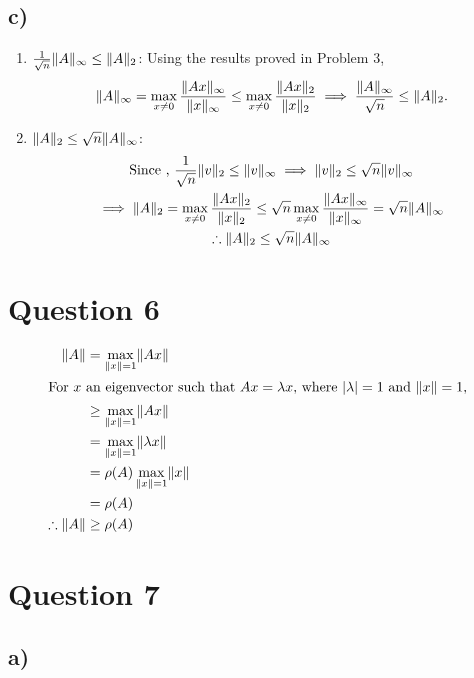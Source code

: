 \documentclass[12pt]{article}
\DeclarePairedDelimiter{\norm}{\lVert}{\rVert}
\theoremstyle{definition}
\theoremstyle{definition}
\theoremstyle{definition}
\theoremstyle{definition}
\theoremstyle{definition}
\theoremstyle{example}
\theoremstyle{note}
\theoremstyle{remark}
\theoremstyle{example}
\begin{document}
				\subsection*{c)} 
					\begin{enumerate}[label=(\roman*)]
						\item $\frac{1}{\sqrt{n}} \norm{A}_{\infty} \le \norm{A}_{2}$: Using the results proved in Problem $3$, 
						\begin{align*}
							\norm{A}_{\infty} = \max\limits_{x \neq 0 } \frac{\norm{Ax}_{\infty}}{\norm{x}_{\infty}} \le \max\limits_{x \neq 0} \frac{\norm{Ax}_{2}}{\norm{x}_{2}} \implies \frac{\norm{A}_{\infty}}{\sqrt{n }} \le \norm{A}_{2}. 
						\end{align*}
						\item $\norm{A}_{2} \le \sqrt{n} \norm{A}_{\infty}$: 
						\begin{gather*}
							\text{Since , } \frac{1}{\sqrt{n}} \norm{v}_{2} \le \norm{v}_{\infty} \implies \norm{v}_{2} \le \sqrt{n} \norm{v}_{\infty} \\
							\implies \norm{A}_{2}  = \max\limits_{x \neq 0} \frac{\norm{Ax}_{2}}{\norm{x}_{2}} \le \sqrt{n} \max\limits_{x \neq 0} \frac{\norm{Ax}_{\infty}}{\norm{x}_{\infty}} = \sqrt{n} \norm{A}_{\infty} \\
							\therefore \norm{A}_{2} \le \sqrt{n} \norm{A}_{\infty}
						\end{gather*}
					\end{enumerate}
			\section*{Question 6}
				\begin{align*}
					\norm{A} &= \max\limits_{\norm{x} =1 } \norm{Ax} \\
					\intertext{For $x$ an eigenvector such that $Ax = \lambda x$, where $\abs{\lambda }=1$ and $\norm{x}=1$, }
					&\ge \max\limits_{\norm{x} =1 }\norm{Ax} \\
					&= \max\limits_{\norm{x} =1 } \norm{\lambda x} \\
					&= \rho(A) \max\limits_{\norm{x} =1 } \norm{x} \\
					&= \rho(A) \\
					\therefore \norm{A} &\ge \rho(A)
				\end{align*}
			\section*{Question 7}
				\subsection*{a) }
					
\end{document}
